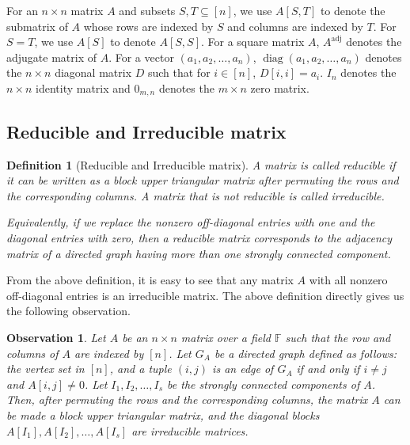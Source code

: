 \documentclass[11pt,letterpaper]{article}
\DeclareMathOperator*{\diag}{diag}
\newcommand{\F}{\mathbb{F}}
\newtheorem{observation}{Observation}[section]
\newtheorem{definition}{Definition}[section]
\begin{document}
{{{For an $n\times n$ matrix $A$ and subsets $S, T\subseteq [n]$, we use $A[S,T]$ to denote the submatrix of $A$ whose rows are indexed by $S$ and columns are indexed by $T$. For $S=T$, we use $A[S]$ to denote $A[S, S]$. For a square matrix $A$, $A^{\mathrm{adj}}$ denotes the adjugate matrix of $A$. For a vector $(a_1,a_2,\ldots, a_n)$, $\diag(a_1, a_2, \ldots, a_n)$ denotes the $n\times n$ diagonal matrix $D$ such that for $i\in[n]$, $D[i, i]=a_i$. $I_n$ denotes the $n \times n$ identity matrix and $0_{m,n}$ denotes the $m \times n$ zero matrix.

\subsection{Reducible and Irreducible matrix}
\begin{definition}[Reducible and Irreducible matrix] 
\label{def:Reducible}
A matrix is called \emph{reducible} if it can be written as a block upper triangular matrix after permuting the rows and the corresponding columns. A matrix that is not reducible is called \emph{irreducible}. 

Equivalently, if we replace the nonzero off-diagonal entries with one and the diagonal entries with zero, then a reducible matrix corresponds to the adjacency matrix of a directed graph having more than one strongly connected component.
\end{definition}
%
From the above definition, it is easy to see that any matrix $A$ with all nonzero off-diagonal entries is an irreducible matrix. The above definition directly gives us the following observation.
%
\begin{observation}
\label{ob:irreducible-matrix-and-directed-graph}
Let $A$ be an $n\times n$ matrix over a field $\F$ such that the row and columns of $A$ are indexed by $[n]$. Let $G_A$ be a directed graph defined as follows: the vertex set in $[n]$, and a tuple $(i,j)$ is an edge of $G_A$ if and only if $i\neq j$ and $A[i,j]\neq 0$. Let $I_1, I_2,\ldots, I_s$ be the strongly connected components of $A$. Then, after permuting the rows and the corresponding columns, the matrix $A$ can be made a block upper triangular matrix, and the diagonal blocks $A[I_1], A[I_2],\ldots, A[I_s]$ are irreducible matrices.
\end{observation}

}}}
\end{document}
